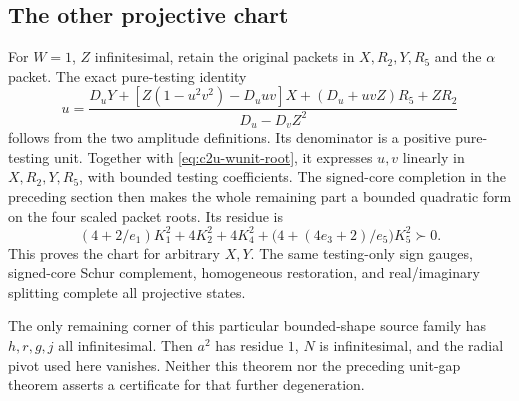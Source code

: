 \subsection{The other projective chart}
For $W=1$, $Z$ infinitesimal, retain the original packets in
$X,R_2,Y,R_5$ and the $\alpha$ packet.  The exact pure-testing identity
\begin{equation}
u=\frac{D_uY+[Z(1-u^2v^2)-D_uuv]X+(D_u+uvZ)R_5+ZR_2}
{D_u-D_vZ^2}
\label{eq:c2y-Wunit}
\end{equation}
follows from the two amplitude definitions.  Its denominator is a
positive pure-testing unit.  Together with \eqref{eq:c2u-wunit-root},
it expresses $u,v$ linearly in $X,R_2,Y,R_5$, with bounded testing
coefficients.  The signed-core completion in the preceding section
then makes the whole remaining part a bounded quadratic form on the
four scaled packet roots.  Its residue is
\[
(4+2/e_1)K_1^2+4K_2^2+4K_4^2+
\bigl(4+(4e_3+2)/e_5\bigr)K_5^2\succ0.
\]
This proves the chart for arbitrary $X,Y$.  The same testing-only sign
gauges, signed-core Schur complement, homogeneous restoration, and
real/imaginary splitting complete all projective states.

The only remaining corner of this particular bounded-shape source
family has $h,r,g,j$ all infinitesimal.  Then $a^2$ has residue $1$,
$N$ is infinitesimal, and the radial pivot used here vanishes.
Neither this theorem nor the preceding unit-gap theorem asserts a
certificate for that further degeneration.
